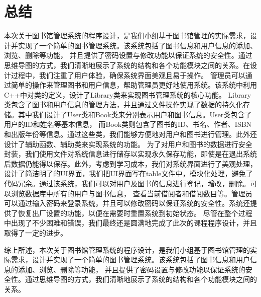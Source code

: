 \documentclass{article}
\begin{document}
\section{总结}

本次关于图书馆管理系统的程序设计，是我们小组基于图书馆管理的实际需求，设计并实现了一个简单的图书管理系统。该系统包括了图书信息和用户信息的添加、浏览、删除等功能，
并且提供了密码设置与修改功能以保证系统的安全性。通过思维导图的方式，我们清晰地展示了系统的结构和各个功能模块之间的关系。在设计过程中，我们注重了用户体验，确保系统界面美观且易于操作。
管理员可以通过简单的操作来管理图书和用户信息，帮助管理员更好地使用系统。该系统中利用C++中对类的定义，设计了Library类来实现图书管理系统的核心功能。
Library类包含了图书和用户信息的管理方法，并且通过文件操作实现了数据的持久化存储。其中我们设计了User类和Book类来分别表示用户和图书信息。User类包含了用户的ID和姓名等基本信息，
而Book类则包含了图书的ID、书名、作者、ISBN和出版年份等信息。通过这些类，我们能够方便地对用户和图书进行管理。此外还设计了辅助函数、辅助类来实现系统的功能。
为了对用户和图书的数据进行安全封装，我们使用文件对系统信息进行储存以实现永久保存功能，即使是在退出系统后数据仍能得以保存。此外，考虑到学习成本，我们对系统界面进行了美观处理，
设计了简洁明了的UI界面，我们把UI界面写在table文件中，模块化处理，避免了代码冗余。通过该系统，我们可以对用户及图书的信息进行登记，增改，删除。可以浏览数据库中所有的用户与图书信息，
查看当前借阅者和借阅数目等。管理员可以通过输入密码来登录系统，并且可以修改密码以保证系统的安全性。系统还提供了恢复出厂设置的功能，以便在需要时重置系统到初始状态。
尽管在整个过程中出现了不少困难和错误，我们最终还是圆满地完成了此次的课程程序设计，并且取得了一定的进步。

综上所述，本次关于图书馆管理系统的程序设计，是我们小组基于图书馆管理的实际需求，设计并实现了一个简单的图书管理系统。该系统包括了图书信息和用户信息的添加、浏览、删除等功能，
并且提供了密码设置与修改功能以保证系统的安全性。通过思维导图的方式，我们清晰地展示了系统的结构和各个功能模块之间的关系。 
\end{document}
